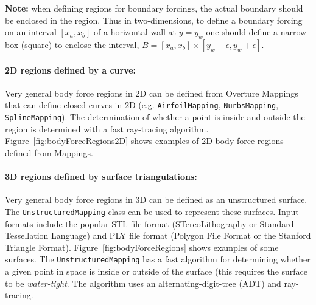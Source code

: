 {\bf Note:} when defining regions for boundary forcings, the actual boundary should be enclosed 
in the region. Thus in two-dimensions, to define a boundary forcing on an interval $[x_a,x_b]$ of a horizontal
wall at $y=y_w$ one should define a narrow box (square) to enclose the interval, $B = [x_a,x_b]\times[y_w-\epsilon,y_w+\epsilon]$.

\paragraph{2D regions defined by a curve:} Very general body force regions in 2D can be defined
  from Overture Mappings that can define closed curves in 2D (e.g. {\tt AirfoilMapping}, {\tt NurbsMapping}, {\tt SplineMapping}). 
  The determination of whether a point is inside and outside the region is determined with a fast ray-tracing algorithm.
  Figure~\ref{fig:bodyForceRegions2D} shows examples of 2D body force regions defined from Mappings.

\paragraph{3D regions defined by surface triangulations:} Very general body force regions in 3D can be defined
as an unstructured surface. The {\tt UnstructuredMapping} class can be used to
represent these surfaces. Input formats include the popular STL file format
(STereoLithography or Standard Tessellation Language) and PLY file format
(Polygon File Format or the Stanford Triangle
Format). Figure~\ref{fig:bodyForceRegions} shows examples of some surfaces. The
{\tt UnstructuredMapping} has a fast algorithm for determining whether a given
point in space is inside or outside of the surface (this requires the surface to
be {\em water-tight}. The algorithm uses an alternating-digit-tree (ADT) and
ray-tracing.

